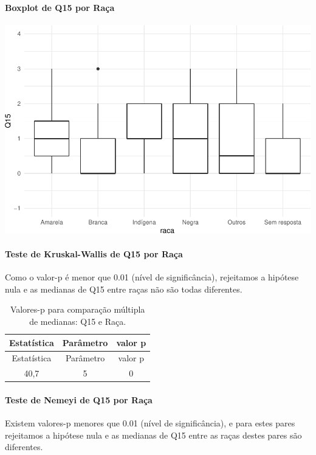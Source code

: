 \documentclass[]{article}
\let\oldparagraph\paragraph
\renewcommand{\paragraph}[1]{\oldparagraph{#1}\mbox{}}
\begin{document}
\hypertarget{boxplot-de-q15-por-rauxe7a}{%
\paragraph{Boxplot de Q15 por Raça}\label{boxplot-de-q15-por-rauxe7a}}

\begin{center}\includegraphics[width=0.75\linewidth]{relatorio_covid19_files/figure-latex/unnamed-chunk-106-1} \end{center}

\hypertarget{teste-de-kruskal-wallis-de-q15-por-rauxe7a}{%
\paragraph{Teste de Kruskal-Wallis de Q15 por Raça}\label{teste-de-kruskal-wallis-de-q15-por-rauxe7a}}

Como o valor-p é menor que 0.01 (nível de significância), rejeitamos a hipótese nula e as medianas de Q15 entre raças não são todas diferentes.

\begin{longtable}[]{@{}ccc@{}}
\caption{\label{tab:unnamed-chunk-108}Valores-p para comparação múltipla de medianas: Q15 e Raça.}\tabularnewline
\toprule
Estatística & Parâmetro & valor p\tabularnewline
\midrule
\endfirsthead
\toprule
Estatística & Parâmetro & valor p\tabularnewline
\midrule
\endhead
40,7 & 5 & 0\tabularnewline
\bottomrule
\end{longtable}

\hypertarget{teste-de-nemeyi-de-q15-por-rauxe7a}{%
\paragraph{Teste de Nemeyi de Q15 por Raça}\label{teste-de-nemeyi-de-q15-por-rauxe7a}}

Existem valores-p menores que 0.01 (nível de significância), e para estes pares rejeitamos a hipótese nula e as medianas de Q15 entre as raças destes pares são diferentes.
\end{document}
